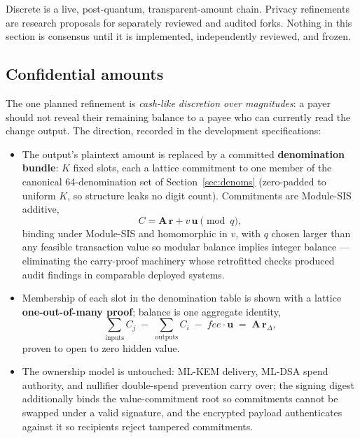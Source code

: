 \documentclass[11pt,a4paper]{article}
\begin{document}
Discrete is a live, post-quantum, transparent-amount chain.
Privacy refinements are research proposals for separately reviewed and audited
forks. Nothing in this section is consensus until it is implemented, independently
reviewed, and frozen.

\subsection{Confidential amounts}

The one planned refinement is \emph{cash-like discretion over magnitudes}: a
payer should not reveal their remaining balance to a payee who can currently
read the change output. The direction, recorded in the development
specifications:

\begin{itemize}
\item The output's plaintext amount is replaced by a committed
  \textbf{denomination bundle}: $K$ fixed slots, each a lattice commitment to
  one member of the canonical 64-denomination set of
  Section~\ref{sec:denoms} (zero-padded to uniform $K$, so structure leaks no
  digit count). Commitments are Module-SIS additive,
  \begin{equation}
  C = \mathbf{A}\,\mathbf{r} + v\,\mathbf{u} \pmod q,
  \end{equation}
  binding under Module-SIS and homomorphic in $v$, with $q$ chosen larger
  than any feasible transaction value so modular balance implies integer
  balance --- eliminating the carry-proof machinery whose retrofitted checks
  produced audit findings in comparable deployed systems.
\item Membership of each slot in the denomination table is shown with a
  lattice \textbf{one-out-of-many proof}; balance is one aggregate identity,
  \begin{equation}
  \sum_{\mathrm{inputs}} C_j \;-\; \sum_{\mathrm{outputs}} C_i \;-\;
  \mathit{fee}\cdot\mathbf{u} \;=\; \mathbf{A}\,\mathbf{r}_\Delta,
  \end{equation}
  proven to open to zero hidden value.
\item The ownership model is untouched: ML-KEM delivery, ML-DSA spend
  authority, and nullifier double-spend prevention carry over; the signing
  digest additionally binds the value-commitment root so commitments cannot
  be swapped under a valid signature, and the encrypted payload authenticates
  against it so recipients reject tampered commitments.
\end{itemize}
\end{document}

